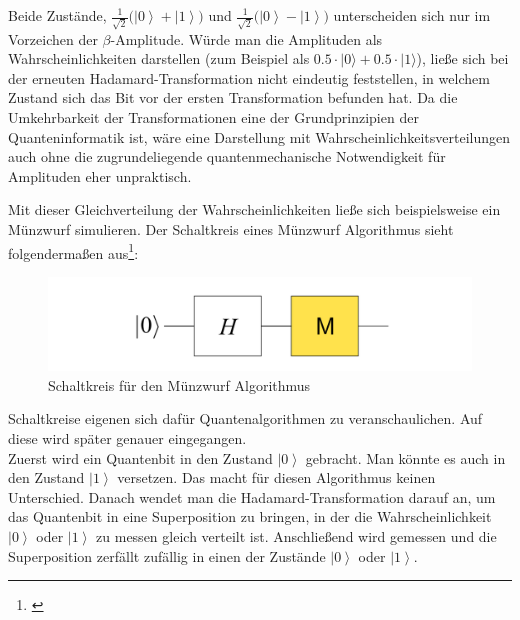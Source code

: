 \begin{tcolorbox}[title=Kommentar,
    title filled=false,
    colback=cyan!5!white,
    colframe=cyan!75!black]
Beide Zustände,  $\frac{1}{\sqrt2}(\left|\left.0\right\rangle+\right.\left|\left.1\right\rangle)\right.$ und $\frac{1}{\sqrt2}(\left|\left.0\right\rangle-\right.\left|\left.1\right\rangle)\right.$ unterscheiden sich nur im Vorzeichen der $\beta$-Amplitude. Würde man die Amplituden als Wahrscheinlichkeiten darstellen (zum Beispiel als $0.5\cdot\left|0\right.\rangle+0.5\cdot\left|1\right.\rangle$), ließe sich bei der erneuten Hadamard-Transformation nicht eindeutig feststellen, in welchem Zustand sich das Bit vor der ersten Transformation befunden hat. Da die Umkehrbarkeit der Transformationen eine der Grundprinzipien der Quanteninformatik ist, wäre eine Darstellung mit Wahrscheinlichkeitsverteilungen auch ohne die zugrundeliegende quantenmechanische Notwendigkeit für Amplituden eher unpraktisch.
\end{tcolorbox}

Mit dieser Gleichverteilung der Wahrscheinlichkeiten ließe sich beispielsweise ein Münzwurf simulieren. Der Schaltkreis eines Münzwurf Algorithmus sieht folgendermaßen aus\footnote{\cite[S. 27]{homeister_quantum_2022}}: \\

\begin{figure}[h]
    \centering
    \includegraphics[width=0.7\linewidth]{img/MuenzwurfSchaltkreis.png}
    \caption{Schaltkreis für den Münzwurf Algorithmus}
    \label{fig:Muenzwurf}
\end{figure}


Schaltkreise eigenen sich dafür Quantenalgorithmen zu veranschaulichen. Auf diese wird später genauer eingegangen.\\

Zuerst wird ein Quantenbit in den Zustand $\left|0\right\rangle$ gebracht. Man könnte es auch in den Zustand $\left|1\right\rangle$ versetzen. Das macht für diesen Algorithmus keinen Unterschied. Danach wendet man die Hadamard-Transformation darauf an, um das Quantenbit in eine Superposition zu bringen, in der die Wahrscheinlichkeit $\left|0\right\rangle$ oder $\left|1\right\rangle$ zu messen gleich verteilt ist. Anschließend wird gemessen und die Superposition zerfällt zufällig in einen der Zustände $\left|0\right\rangle$ oder $\left|1\right\rangle$.

